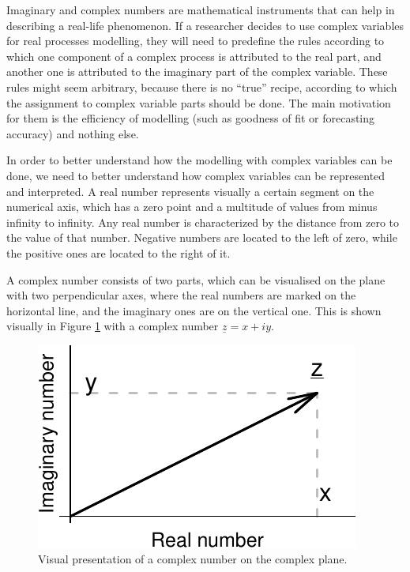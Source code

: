 \documentclass[
]{book}
\begin{document}
Imaginary and complex numbers are mathematical instruments that can help in describing a real-life phenomenon. If a researcher decides to use complex variables for real processes modelling, they will need to predefine the rules according to which one component of a complex process is attributed to the real part, and another one is attributed to the imaginary part of the complex variable. These rules might seem arbitrary, because there is no ``true'' recipe, according to which the assignment to complex variable parts should be done. The main motivation for them is the efficiency of modelling (such as goodness of fit or forecasting accuracy) and nothing else.

In order to better understand how the modelling with complex variables can be done, we need to better understand how complex variables can be represented and interpreted. A real number represents visually a certain segment on the numerical axis, which has a zero point and a multitude of values from minus infinity to infinity. Any real number is characterized by the distance from zero to the value of that number. Negative numbers are located to the left of zero, while the positive ones are located to the right of it.

A complex number consists of two parts, which can be visualised on the plane with two perpendicular axes, where the real numbers are marked on the horizontal line, and the imaginary ones are on the vertical one. This is shown visually in Figure \ref{fig:complexPlane} with a complex number \(\underline{z}=x+iy\).

\begin{figure}
\centering
\includegraphics{Svetunkov---Svetunkov---Complex-Valued-Econometrics_files/figure-latex/complexPlane-1.pdf}
\caption{\label{fig:complexPlane}Visual presentation of a complex number on the complex plane.}
\end{figure}
\end{document}
